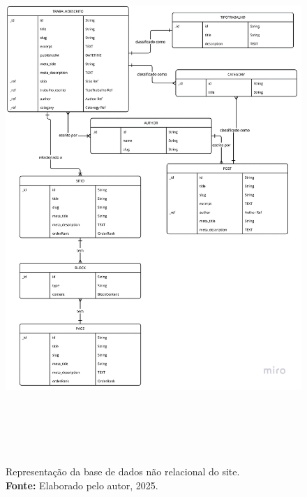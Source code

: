     \begin{figure}[H]
        \centering
        \includegraphics[height=20cm, keepaspectratio]{img/sanity/upscalemedia-transformed.png}
        \caption{ Representação da base de dados não relacional do site.\\
            \textbf{Fonte:} Elaborado pelo autor, 2025.}
        \label{fig:diagrama sanity}
    \end{figure}

